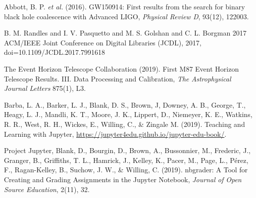 \documentclass[twocolumn]{svjour3}          %
\begin{document}

\begin{thebibliography}{99}
%
%
Abbott, B. P. \textit{et al.} (2016).
GW150914: First results from the search for binary black hole coalescence with Advanced LIGO,
\textit{Physical Review D}, 93(12), 122003.

B. M. {Randles} and I. V. {Pasquetto} and M. S. {Golshan} and C. L. {Borgman}
2017 ACM/IEEE Joint Conference on Digital Libraries (JCDL),
2017, doi={10.1109/JCDL.2017.7991618}

The Event Horizon Telescope Collaboration (2019).
First M87 Event Horizon Telescope Results. III. Data Processing and Calibration,
\textit{The Astrophysical Journal Letters} 875(1), L3.

Barba, L. A., Barker, L. J., Blank, D. S., Brown, J, Downey, A. B., George, T.,
Heagy, L. J., Mandli, K. T., Moore, J. K., Lippert, D., Niemeyer, K. E.,
Watkins, R. R., West, R. H., Wickes, E., Willing, C., \& Zingale M. (2019).
Teaching and Learning with Jupyter,
\url{https://jupyter4edu.github.io/jupyter-edu-book/}.

Project Jupyter, Blank, D., Bourgin, D., Brown, A., Bussonnier, M.,
Frederic, J., Granger, B., Griffiths, T. L.,  Hamrick, J., Kelley, K.,
Pacer, M., Page, L., P{\'e}rez, F., Ragan-Kelley, B., Suchow, J. W.,
\& Willing, C. (2019).
nbgrader: A Tool for Creating and Grading Assignments in the Jupyter Notebook,
\textit{Journal of Open Source Education}, 2(11), 32.
\end{thebibliography}
\end{document}
